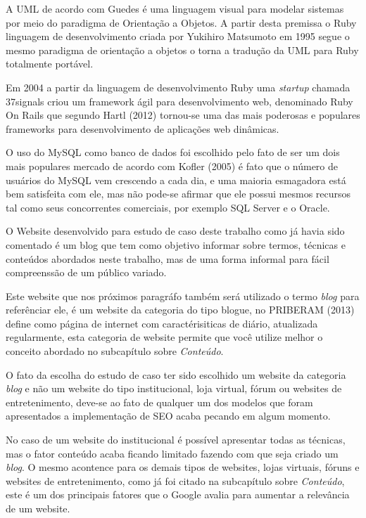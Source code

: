 \documentclass[
	12pt,				%
	openright,			%
	twoside,			%
	a4paper,			%
	english,			%
	french,				%
	spanish,			%
	brazil				%
	]{abntex2}
\begin{document}
A UML de acordo com Guedes é uma linguagem visual para modelar sistemas por meio do paradigma de Orientação a Objetos. A partir desta premissa o Ruby linguagem de desenvolvimento criada por Yukihiro Matsumoto em 1995 segue o mesmo paradigma de orientação a objetos o torna a tradução da UML para Ruby totalmente portável.

Em 2004 	a partir da linguagem de desenvolvimento Ruby uma \textit{startup} chamada 37signals criou um framework ágil  para desenvolvimento web, denominado Ruby On Rails que segundo Hartl (2012) tornou-se uma das mais poderosas e populares frameworks para desenvolvimento de aplicações web dinâmicas.

O uso do MySQL como banco de dados foi escolhido pelo fato de ser um dois mais populares mercado de acordo com Kofler (2005) é fato que o número de usuários do MySQL vem crescendo a cada dia, e uma maioria esmagadora está bem satisfeita com ele, mas não pode-se afirmar que ele possui mesmos recursos tal como seus concorrentes comerciais, por exemplo SQL Server e o Oracle.

O Website desenvolvido para estudo de caso deste trabalho como já havia sido comentado é um blog que tem como objetivo informar sobre termos, técnicas e conteúdos abordados neste trabalho, mas de uma forma informal para fácil compreenssão de um público variado.

Este website que nos próximos paragráfo também será utilizado o termo \textit{blog} para referênciar ele, é um website da categoria do tipo blogue, no PRIBERAM (2013) define como página de internet com caractérisiticas de diário, atualizada regularmente, esta categoria de website permite que você utilize melhor o conceito abordado no subcapítulo sobre \textit{Conteúdo}.

O fato da escolha do estudo de caso ter sido escolhido um website da categoria \textit{blog} e não um website do tipo institucional, loja virtual, fórum ou websites de entretenimento, deve-se ao fato de qualquer um dos modelos que foram apresentados a implementação de SEO acaba pecando em algum momento.

No caso de um website do institucional é possível apresentar todas as técnicas, mas o fator conteúdo acaba ficando limitado fazendo com que seja criado um \textit{blog}. O mesmo acontence para os demais tipos de websites, lojas virtuais, fóruns e websites de entretenimento, como já foi citado na subcapítulo sobre \textit{Conteúdo}, este é um dos principais fatores que o Google avalia para aumentar a relevância de um website.
\end{document}
